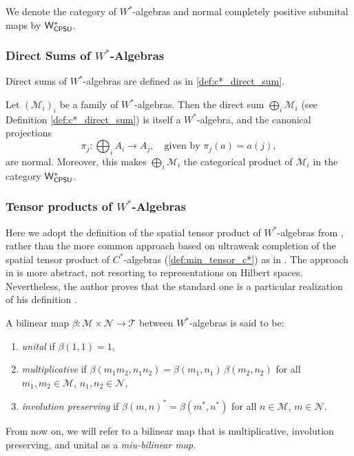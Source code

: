 \begin{definition}
  We denote the category of $W^*$-algebras and normal completely positive subunital maps by $\mathsf{W^*_{CPSU}}$.
\end{definition}

\subsubsection{Direct Sums of $W^*$-Algebras}

Direct sums of $W^*$-algebras are defined as in \autoref{def:c*_direct_sum}.


\begin{proposition} \cite[Exercise 47 IV]{westerbaanCategoryNeumannAlgebras2019}  \label{prop:wcpsu_products}
  Let \( (\mathscr{M}_i)_i \) be a family of $W^*$-algebras. Then the direct sum \( \bigoplus_i \mathscr{M}_i \) (see Definition \ref{def:c*_direct_sum}) is itself a $W^*$-algebra, and the canonical projections
\[
\pi_j : \bigoplus_i A_i \to A_j, \quad \text{given by } \pi_j(a) = a(j),
\]
are normal.
Moreover, this makes \( \bigoplus_i \mathscr{M}_i \) the categorical product of \( \mathscr{M}_i \) in the category $\mathsf{W^*_{CPSU}}$.
\end{proposition}


\subsubsection{Tensor products of $W^*$-Algebras}
Here we adopt the definition of the spatial tensor product of $W^*$-algebras from \cite{westerbaanCategoryNeumannAlgebras2019}, rather than the more common approach based on ultraweak completion of the spatial tensor product of $C^*$-algebras (\autoref{def:min_tensor_c*}) as in \cite{takesakiTheoryOperatorAlgebras1979,sakaiCAlgebrasWAlgebras1998}. 
The approach in \cite{westerbaanCategoryNeumannAlgebras2019} is more abstract, not resorting to representations on Hilbert spaces. Nevertheless, the author proves that the standard one is a particular realization of his definition  \cite[Theorem 111 VII]{westerbaanCategoryNeumannAlgebras2019}.


\begin{definition}
  A bilinear map \( \beta:  \mathscr{M} \times  \mathscr{N} \to  \mathscr{T} \) between $W^*$-algebras is said to be:
\begin{enumerate}
    \item \emph{unital} if \( \beta(1,1) = 1 \),
    \item \emph{multiplicative} if \( \beta(m_1m_2, n_1n_2) = \beta(m_1, n_1) \, \beta(m_2, n_2) \) for all \( m_1, m_2 \in \mathscr{M} \), \( n_1, n_2  \in \mathscr{N}\),
    \item \emph{involution preserving} if \( \beta(m, n)^* = \beta(m^*, n^*) \) for all \( n \in \mathscr{M} \), \( m \in \mathscr{N} \).
\end{enumerate}
From now on, we will refer to a bilinear map that is multiplicative, involution preserving, and unital as a \emph{miu-bilinear map}.
\end{definition}


